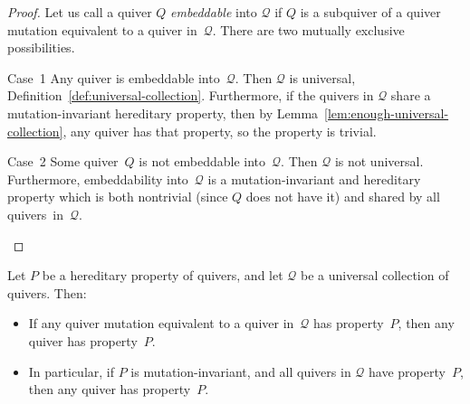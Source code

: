 \begin{proof}
Let us call a quiver $Q$ \emph{embeddable} into $\mathcal{Q}$ if $Q$ is a subquiver of a quiver mutation equivalent to a quiver in~$\mathcal{Q}$. There are two mutually exclusive possibilities.

\begin{enonce*}[remark]{Case~1} Any quiver is embeddable into~$\mathcal{Q}$. Then $\mathcal{Q}$ is universal, \cf Definition~\ref{def:universal-collection}. Furthermore, if the quivers in $\mathcal{Q}$ share a mutation-invariant hereditary property, then by Lemma~\ref{lem:enough-universal-collection}, any quiver has that property, so the property is trivial. 
\end{enonce*}

\begin{enonce*}[remark]{Case~2} Some quiver~$Q$ is not embeddable into~$\mathcal{Q}$. Then $\mathcal{Q}$ is not universal. Furthermore, embeddability into~$\mathcal{Q}$ is a mutation-invariant and hereditary property which is both nontrivial (since $Q$ does not have it) and shared by all quivers~in~$\mathcal{Q}$. \qedhere
\end{enonce*}
\end{proof}

\begin{lemma}
\label{lem:enough-universal-collection}
Let $P$ be a hereditary property of quivers, 
and let $\mathcal{Q}$ be a universal collection of quivers. 
 Then: 
\begin{itemize}%
\item
If any quiver mutation equivalent to a quiver in~$\mathcal{Q}$ has property~$P$, 
then any quiver has property~$P$.
\item
In particular, if $P$ is mutation-invariant, and all quivers in $\mathcal{Q}$ have property~$P$, 
then any quiver has property~$P$.
\end{itemize}
\end{lemma}

